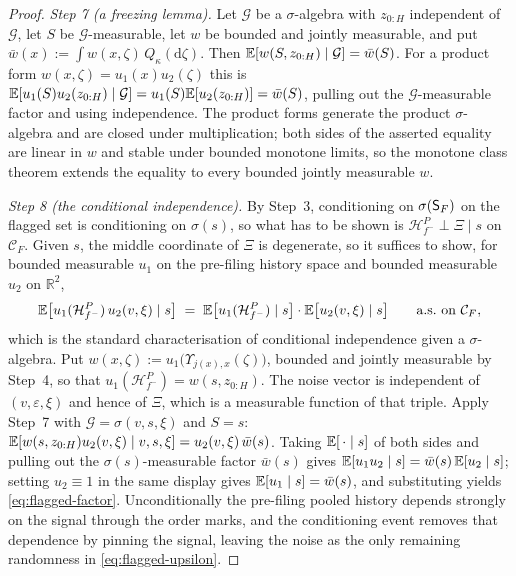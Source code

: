 \begin{proof}
\emph{Step 7 (a freezing lemma).} Let $\mathcal G$ be a $\sigma$-algebra with $z_{0:H}$ independent
of $\mathcal G$, let $S$ be $\mathcal G$-measurable, let $w$ be bounded and jointly measurable, and
put $\bar w(x):=\int w(x,\zeta)\,Q_\kappa(\mathrm d\zeta)$. Then
$\mathbb{E}[w(S,z_{0:H})\mid\mathcal G]=\bar w(S)$. For a product form $w(x,\zeta)=u_1(x)u_2(\zeta)$ this
is $\mathbb{E}[u_1(S)u_2(z_{0:H})\mid\mathcal G]=u_1(S)\mathbb{E}[u_2(z_{0:H})]=\bar w(S)$, pulling out the
$\mathcal G$-measurable factor and using independence. The product forms generate the product
$\sigma$-algebra and are closed under multiplication; both sides of the asserted equality are linear
in $w$ and stable under bounded monotone limits, so the monotone class theorem extends the equality
to every bounded jointly measurable $w$.

\emph{Step 8 (the conditional independence).} By Step~3, conditioning on $\sigma(\mathsf{S}_F)$ on the
flagged set is conditioning on $\sigma(s)$, so what has to be shown is
$\mathcal H_{f^-}^P \perp \Xi \mid s$ on $\mathcal C_F$. Given $s$, the middle coordinate of $\Xi$ is
degenerate, so it suffices to show, for bounded measurable $u_1$ on the pre-filing history space and
bounded measurable $u_2$ on $\mathbb R^2$,
\begin{equation}
\label{eq:flagged-factor}
\mathbb{E}\bigl[u_1(\mathcal H_{f^-}^P)\,u_2(v,\xi) \mid s\bigr]
 \;=\; \mathbb{E}\bigl[u_1(\mathcal H_{f^-}^P) \mid s\bigr]\cdot\mathbb{E}\bigl[u_2(v,\xi) \mid s\bigr]
 \qquad \text{a.s.\ on } \mathcal C_F,
\end{equation}
which is the standard characterisation of conditional independence given a $\sigma$-algebra. Put
$w(x,\zeta):=u_1\bigl(\Upsilon_{j(x),x}(\zeta)\bigr)$, bounded and jointly measurable by Step~4, so
that $u_1(\mathcal H_{f^-}^P)=w(s,z_{0:H})$. The noise vector is independent of
$(v,\varepsilon,\xi)$ and hence of $\Xi$, which is a measurable function of that triple. Apply
Step~7 with $\mathcal G=\sigma(v,s,\xi)$ and $S=s$:
$\mathbb{E}[w(s,z_{0:H})u_2(v,\xi)\mid v,s,\xi]=u_2(v,\xi)\,\bar w(s)$. Taking $\mathbb{E}[\,\cdot\mid s]$ of
both sides and pulling out the $\sigma(s)$-measurable factor $\bar w(s)$ gives
$\mathbb{E}[u_1u_2\mid s]=\bar w(s)\,\mathbb{E}[u_2\mid s]$; setting $u_2\equiv1$ in the same display gives
$\mathbb{E}[u_1\mid s]=\bar w(s)$, and substituting yields \eqref{eq:flagged-factor}. Unconditionally the
pre-filing pooled history depends strongly on the signal through the order marks, and the
conditioning event removes that dependence by pinning the signal, leaving the noise as the only
remaining randomness in \eqref{eq:flagged-upsilon}.


\end{proof}
